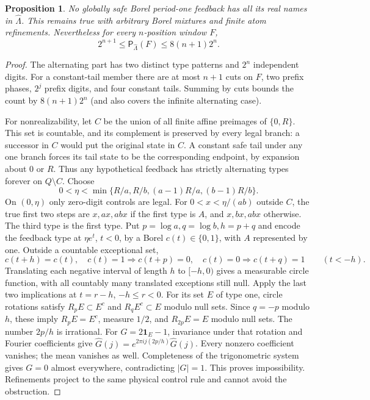 \documentclass[11pt,reqno]{amsart}
\numberwithin{equation}{section}
\newtheorem{proposition}[theorem]{Proposition}
\theoremstyle{definition}
\newcommand{\Patt}{\mathsf P}
\newcommand{\one}{\mathbf 1}
\begin{document}
\begin{proposition}\label{prop:alternation}
No globally safe Borel period-one feedback has all its real names
in $\widehat\Lambda$. This remains true with arbitrary Borel
mixtures and finite atom refinements. Nevertheless for every
$n$-position window $F$,
\[
 2^{n+1}\le\Patt_{\widehat\Lambda}(F)\le8(n+1)2^n.
\]
\end{proposition}
\begin{proof}
The alternating part has two distinct type patterns and $2^n$
independent digits. For a constant-tail member there are at most
$n+1$ cuts on $F$, two prefix phases, $2^j$ prefix digits, and
four constant tails. Summing by cuts bounds the count by
$8(n+1)2^n$ (and also covers the infinite alternating case).

For nonrealizability, let $C$ be the union of all finite affine
preimages of $\{0,R\}$. This set is countable, and its complement is preserved by every
legal branch: a successor in $C$ would put the original state in $C$. A constant safe tail under any one
branch forces its tail state to be the corresponding endpoint,
by expansion about $0$ or $R$. Thus any hypothetical feedback
has strictly alternating types forever on $Q\setminus C$.
Choose
\[
 0<\eta<\min\{R/a,R/b,(a-1)R/a,(b-1)R/b\}.
\]
On $(0,\eta)$ only zero-digit controls are legal. For
$0<x<\eta/(ab)$ outside $C$, the true first two steps are
$x,ax,abx$ if the first type is $A$, and $x,bx,abx$ otherwise.
The third type is the first type. Put $p=\log a,q=\log b,h=p+q$
and encode the feedback type at $\eta e^t$, $t<0$, by a Borel
$c(t)\in\{0,1\}$, with $A$ represented by one. Outside a
countable exceptional set,
\[
 c(t+h)=c(t),\quad
 c(t)=1\Rightarrow c(t+p)=0,\quad
 c(t)=0\Rightarrow c(t+q)=1\qquad(t<-h).
\]
Translating each negative interval of length $h$ to $[-h,0)$
gives a measurable circle function, with all countably many
translated exceptions still null. Apply the last two implications
at $t=r-h$, $-h\le r<0$. For its set $E$ of type one, circle
rotations satisfy $R_pE\subset E^c$ and $R_qE^c\subset E$
modulo null sets. Since $q=-p$ modulo $h$, these imply
$R_pE=E^c$, measure $1/2$, and $R_{2p}E=E$ modulo null sets.
The number $2p/h$ is irrational. For
$G=2\one_E-1$, invariance under that rotation and Fourier
coefficients give
$\widehat G(j)=e^{2\pi i j(2p/h)}\widehat G(j)$.
Every nonzero coefficient vanishes; the mean vanishes as well.
Completeness of the trigonometric system gives $G=0$ almost
everywhere, contradicting $|G|=1$. This proves impossibility.
Refinements project to the same physical control rule and cannot
avoid the obstruction.
\end{proof}
\end{document}
